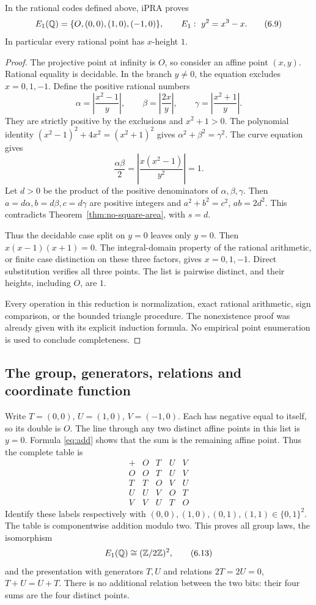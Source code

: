 \begin{theorem}\label{thm:e1}
In the rational codes defined above, iPRA proves
\[
 E_1(\mathbb Q)=\{O,(0,0),(1,0),(-1,0)\},
 \qquad E_1:\ y^2=x^3-x.
 \tag{6.9}\label{eq:e1points}
\]
In particular every rational point has $x$-height $1$.
\end{theorem}
\begin{proof}
The projective point at infinity is $O$, so consider an affine point
$(x,y)$. Rational equality is decidable. In the branch $y\ne0$,
the equation excludes $x=0,1,-1$. Define the positive rational numbers
\[
 \alpha=\left|\frac{x^2-1}{y}\right|,
 \qquad
 \beta=\left|\frac{2x}{y}\right|,
 \qquad
 \gamma=\left|\frac{x^2+1}{y}\right|.
 \tag{6.10}\label{eq:triangle-map}
\]
They are strictly positive by the exclusions and $x^2+1>0$.
The polynomial identity
$(x^2-1)^2+4x^2=(x^2+1)^2$ gives
$\alpha^2+\beta^2=\gamma^2$. The curve equation gives
\[
 \frac{\alpha\beta}{2}
   =\left|\frac{x(x^2-1)}{y^2}\right|=1.
 \tag{6.11}
\]
Let $d>0$ be the product of the positive denominators of
$\alpha,\beta,\gamma$. Then
$a=d\alpha,b=d\beta,c=d\gamma$ are positive integers and
$a^2+b^2=c^2$, $ab=2d^2$. This contradicts
Theorem~\ref{thm:no-square-area}, with $s=d$.

Thus the decidable case split on $y=0$ leaves only $y=0$.
Then $x(x-1)(x+1)=0$. The integral-domain property of the rational
arithmetic, or finite case distinction on these three factors,
gives $x=0,1,-1$. Direct substitution verifies all three points.
The list is pairwise distinct, and their heights, including $O$, are $1$.

Every operation in this reduction is normalization, exact rational
arithmetic, sign comparison, or the bounded triangle procedure.
The nonexistence proof was already given with its explicit induction
formula. No empirical point enumeration is used to conclude completeness.
\end{proof}

\subsection{The group, generators, relations and coordinate function}

Write $T=(0,0)$, $U=(1,0)$, $V=(-1,0)$. Each has negative equal to
itself, so its double is $O$. The line through any two distinct affine
points in this list is $y=0$. Formula \eqref{eq:add} shows that the sum
is the remaining affine point. Thus the complete table is
\[
\begin{array}{c|cccc}
 +&O&T&U&V\\ \hline
 O&O&T&U&V\\
 T&T&O&V&U\\
 U&U&V&O&T\\
 V&V&U&T&O
\end{array}
\tag{6.12}
\]
Identify these labels respectively with
$(0,0),(1,0),(0,1),(1,1)\in\{0,1\}^2$.
The table is componentwise addition modulo two. This proves all group
laws, the isomorphism
\[
                     E_1(\mathbb Q)\cong(\mathbb Z/2\mathbb Z)^2,
 \tag{6.13}
\]
and the presentation with generators $T,U$ and relations
$2T=2U=0$, $T+U=U+T$. There is no additional relation between the two
bits: their four sums are the four distinct points.

